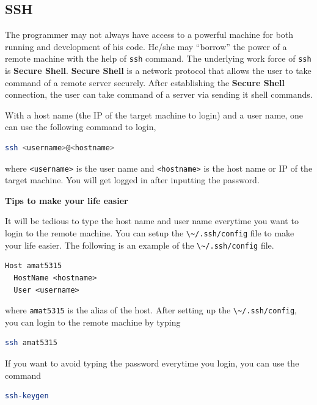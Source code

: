 \documentclass[
  notoc %
]{tufte-book}
\newcommand{\passthrough}[1]{#1}
\begin{document}
\hypertarget{sec:ssh}{%
\subsection{SSH}\label{sec:ssh}}

The programmer may not always have access to a powerful machine for both
running and development of his code. He/she may ``borrow'' the power of
a remote machine with the help of \passthrough{\lstinline!ssh!} command.
The underlying work force of \passthrough{\lstinline!ssh!} is
\textbf{Secure Shell}. \textbf{Secure Shell} is a network protocol that
allows the user to take command of a remote server securely. After
establishing the \textbf{Secure Shell} connection, the user can take
command of a server via sending it shell commands.

With a host name (the IP of the target machine to login) and a user
name, one can use the following command to login,

\begin{lstlisting}[language=bash]
ssh <username>@<hostname>
\end{lstlisting}

where \passthrough{\lstinline!<username>!} is the user name and
\passthrough{\lstinline!<hostname>!} is the host name or IP of the
target machine. You will get logged in after inputting the password.

\textbf{Tips to make your life easier}

It will be tedious to type the host name and user name everytime you
want to login to the remote machine. You can setup the
\passthrough{\lstinline!\~/.ssh/config!} file to make your life easier.
The following is an example of the
\passthrough{\lstinline!\~/.ssh/config!} file.

\begin{lstlisting}
Host amat5315
  HostName <hostname>
  User <username>
\end{lstlisting}

where \passthrough{\lstinline!amat5315!} is the alias of the host. After
setting up the \passthrough{\lstinline!\~/.ssh/config!}, you can login
to the remote machine by typing

\begin{lstlisting}[language=bash]
ssh amat5315
\end{lstlisting}

If you want to avoid typing the password everytime you login, you can
use the command

\begin{lstlisting}[language=bash]
ssh-keygen
\end{lstlisting}
\end{document}
